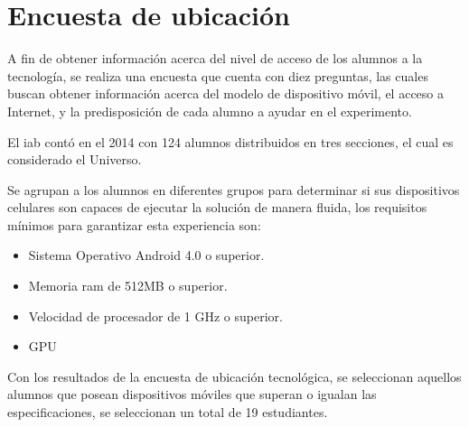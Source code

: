 \section{Encuesta de ubicación}

A fin de obtener información acerca del nivel de acceso  de los alumnos a la
tecnología, se realiza una encuesta que cuenta con diez preguntas, las cuales
buscan obtener información acerca del modelo de dispositivo móvil, el acceso a
Internet, y la predisposición de cada alumno a ayudar en el experimento.

El \Gls{iab} contó en
el 2014 con 124 alumnos distribuidos en tres secciones, el cual es considerado
el Universo.

Se agrupan a los alumnos en diferentes grupos para determinar si sus
dispositivos celulares son capaces de ejecutar la solución de manera fluida, los
requisitos mínimos para garantizar esta experiencia son:

\begin{itemize}
\item Sistema Operativo Android 4.0 o superior.
\item Memoria ram de 512MB o superior.
\item Velocidad de procesador de 1 GHz o superior.
\item GPU 
\end{itemize}

Con los resultados de la encuesta de ubicación tecnológica, se seleccionan
aquellos alumnos que posean dispositivos móviles que superan o igualan las
especificaciones, se seleccionan un total de 19 estudiantes.

